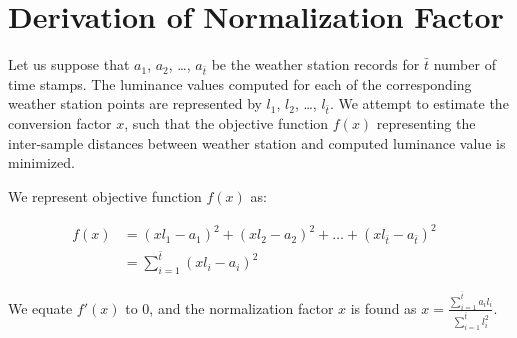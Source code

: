 
\chapter{Derivation of Normalization Factor} %
\label{append:solarestimation} %



Let us suppose that $a_1$, $a_2$, \ldots, $a_{\bar{t}}$ be the weather station records for $\bar{t}$ number of time stamps. The luminance values computed for each of the corresponding weather station points are represented by ${l}_1$, ${l}_2$, \ldots, ${l}_{\bar{t}}$. We attempt to estimate the conversion factor $x$, such that the objective function $f(x)$ representing the inter-sample distances between weather station and computed luminance value is minimized.

We represent objective function $f(x)$ as:

\noindent
\begin{align*}
   f(x) &= (xl_1 - a_1)^2 + (xl_2 - a_2)^2 + \ldots + (xl_{\bar{t}} - a_{\bar{t}})^2 & \\
              &= \sum_{i=1}^{\bar{t}} (xl_i - a_i)^2
\end{align*}

We equate $f'(x)$ to $0$, and the normalization factor $x$ is found as $x = \frac{\sum_{i=1}^{\bar{t}} a_{i}l_{i} }{\sum_{i=1}^{\bar{t}} l_i^2}$.



